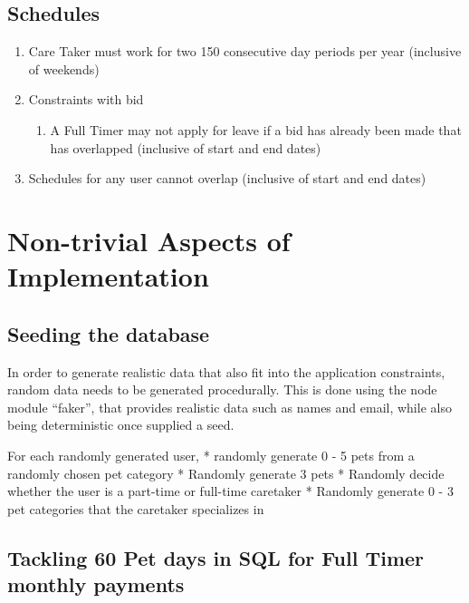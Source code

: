 \documentclass[
  paper=a4,
  ,captions=tableheading
]{scrartcl}
\providecommand{\tightlist}{%
  \setlength{\itemsep}{0pt}\setlength{\parskip}{0pt}}
\begin{document}
\hypertarget{schedules-1}{%
\subsection{Schedules}\label{schedules-1}}

\begin{enumerate}
\def\labelenumi{\arabic{enumi}.}
\tightlist
\item
  Care Taker must work for two 150 consecutive day periods per year
  (inclusive of weekends)
\item
  Constraints with bid

  \begin{enumerate}
  \def\labelenumii{\arabic{enumii}.}
  \tightlist
  \item
    A Full Timer may not apply for leave if a bid has already been made
    that has overlapped (inclusive of start and end dates)
  \end{enumerate}
\item
  Schedules for any user cannot overlap (inclusive of start and end
  dates)
\end{enumerate}

\hypertarget{non-trivial-aspects-of-implementation}{%
\section{Non-trivial Aspects of
Implementation}\label{non-trivial-aspects-of-implementation}}

\hypertarget{seeding-the-database}{%
\subsection{Seeding the database}\label{seeding-the-database}}

In order to generate realistic data that also fit into the application
constraints, random data needs to be generated procedurally. This is
done using the node module ``faker'', that provides realistic data such
as names and email, while also being deterministic once supplied a seed.

For each randomly generated user, * randomly generate 0 - 5 pets from a
randomly chosen pet category * Randomly generate 3 pets * Randomly
decide whether the user is a part-time or full-time caretaker * Randomly
generate 0 - 3 pet categories that the caretaker specializes in

\hypertarget{tackling-60-pet-days-in-sql-for-full-timer-monthly-payments}{%
\subsection{Tackling 60 Pet days in SQL for Full Timer monthly
payments}\label{tackling-60-pet-days-in-sql-for-full-timer-monthly-payments}}
\end{document}
